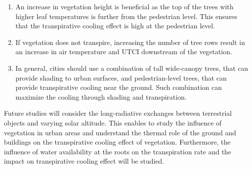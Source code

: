 \begin{enumerate}
\item An increase in vegetation height is beneficial as the top of the trees with higher leaf temperatures is further from the pedestrian level. This ensures that the transpirative cooling effect is high at the pedestrian level. 
\item If vegetation does not transpire, increasing the number of tree rows result in an increase in air temperature and UTCI downstream of the vegetation.  
\item In general, cities should use a combination of tall wide-canopy trees, that can provide shading to urban surfaces, and pedestrian-level trees, that can provide transpirative cooling near the ground. Such combination can maximize the cooling through shading and transpiration.
\end{enumerate}
Future studies will consider the long-radiative exchanges between terrestrial objects and varying solar altitude. This enables to study the influence of vegetation in urban areas and understand the thermal role of the ground and buildings on the transpirative cooling effect of vegetation. Furthermore, the influence of water availability at the roots on the transpiration rate and the impact on transpirative cooling effect will be studied.
